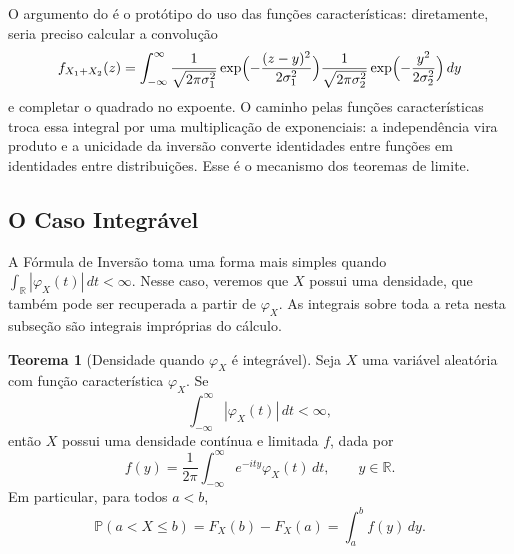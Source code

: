 \documentclass[12pt,portuguese]{article}
\theoremstyle{definition}
\newtheorem{theorem}{Teorema}
\theoremstyle{plainexercise}
\theoremstyle{starredexercise}
\theoremstyle{definition}
\begin{document}
\medskip

O argumento do  é o protótipo do uso das funções
características: diretamente, seria preciso calcular a convolução
\[
  f_{X_1+X_2}(z) = \int_{-\infty}^{\infty}
  \frac{1}{\sqrt{2\pi\sigma_1^2}}
  \exp\Bigl(-\frac{(z-y)^2}{2\sigma_1^2}\Bigr)
  \frac{1}{\sqrt{2\pi\sigma_2^2}}
  \exp\Bigl(-\frac{y^2}{2\sigma_2^2}\Bigr)\,dy
\]
e completar o quadrado no expoente. O caminho pelas funções características
troca essa integral por uma multiplicação de exponenciais: a independência vira
produto e a unicidade da inversão converte identidades entre funções em
identidades entre distribuições. Esse é o mecanismo dos teoremas de limite.

\subsection{O Caso Integrável}\label{subsec:caso-integravel}

A Fórmula de Inversão toma uma forma mais simples quando
$\int_{\mathbb{R}}|\varphi_X(t)|\,dt<\infty$. Nesse caso, veremos que $X$
possui uma densidade, que também pode ser recuperada a partir de $\varphi_X$.
As integrais sobre toda a reta nesta subseção são integrais impróprias do
cálculo.

\begin{theorem}[Densidade quando $\varphi_X$ é integrável]\label{thm:densidade-fc-integravel}
Seja $X$ uma variável aleatória com função característica $\varphi_X$. Se
\[
\int_{-\infty}^{\infty}|\varphi_X(t)|\,dt<\infty,
\]
então $X$ possui uma densidade contínua e limitada $f$, dada por
\[
f(y)=\frac{1}{2\pi}\int_{-\infty}^{\infty}
e^{-ity}\varphi_X(t)\,dt,
\qquad y\in\mathbb{R}.
\]
Em particular, para todos $a<b$,
\[
\mathbb{P}(a<X\leqslant b)=F_X(b)-F_X(a)=\int_a^b f(y)\,dy.
\]
\end{theorem}
\end{document}
